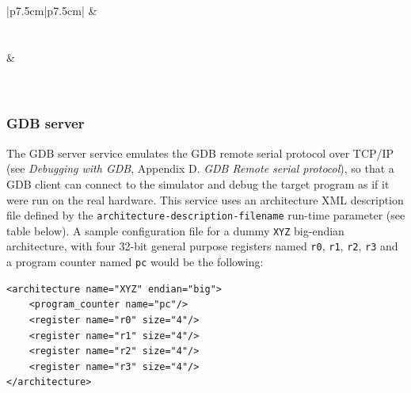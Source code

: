 \begin{center}
\begin{supertabular}{|p{7.5cm}|p{7.5cm}|}
		\hline
		 & \\
		\\
		\\
		\hline
		 & \\
		\\
		\\
		\hline
	\end{supertabular}
\end{center}

\subsubsection{GDB server}
\label{tms320c3x_gdb_server}

The GDB server service emulates the GDB remote serial protocol over TCP/IP (see \textit{Debugging with GDB}, Appendix D. \textit{GDB Remote serial protocol}), so that a GDB client can connect to the simulator and debug the target program as if it were run on the real hardware.
This service uses an architecture XML description file defined by the \texttt{architecture-description-filename} run-time parameter (see table below).
A sample configuration file for a dummy \texttt{XYZ} big-endian architecture, with four 32-bit general purpose registers named \texttt{r0}, \texttt{r1}, \texttt{r2}, \texttt{r3} and a program counter named \texttt{pc} would be the following:
\begin{verbatim}
<architecture name="XYZ" endian="big">
    <program_counter name="pc"/>
    <register name="r0" size="4"/>
    <register name="r1" size="4"/>
    <register name="r2" size="4"/>
    <register name="r3" size="4"/>
</architecture>
\end{verbatim}

